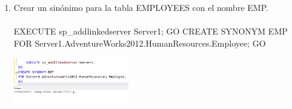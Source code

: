\begin{enumerate}[1.]
	\item Crear un sinónimo para la tabla EMPLOYEES con el nombre EMP.
	\\ \\EXECUTE sp\_addlinkedserver Server1;  GO CREATE SYNONYM EMP FOR Server1.AdventureWorks2012.HumanResources.Employee; GO 	

	\begin{center}
	\includegraphics[width=5cm]{./Imagenes/actividad_03_08}  
	\end{center}	

\end{enumerate}

